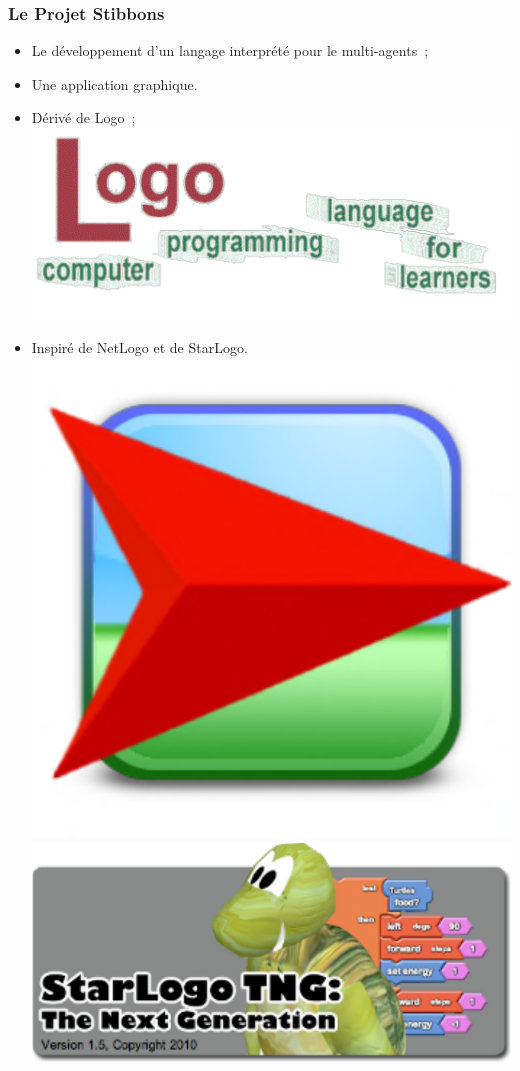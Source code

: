 \begin{frame}
\frametitle{Le Projet Stibbons}
\begin{itemize}
	\item Le développement d'un langage interprété pour le multi-agents~;
	\item Une application graphique.
\end{itemize}
\end{frame}

\begin{frame}
\begin{itemize}
	\item Dérivé de Logo~;
		\includegraphics[scale=0.4]{doc/Presentation/image/logo.pdf}
	\item Inspiré de NetLogo et de StarLogo.
		\includegraphics[scale=0.3]{doc/Presentation/image/netlogo.pdf}
		\includegraphics[scale=0.4]{doc/Presentation/image/starlogo.pdf}
\end{itemize}
\end{frame}


